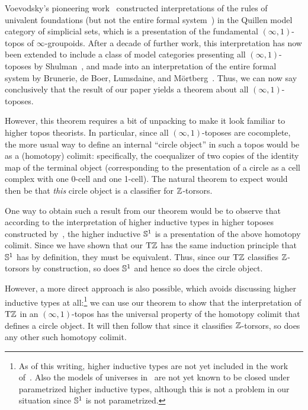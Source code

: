 \documentclass[a4paper,12pt]{amsart}
\begin{document}
Voevodsky's pioneering work~\cite{1211.2851} constructed interpretations of the rules of univalent foundations (but not the entire formal system~\cite{voevodsky:not-interp}) in the Quillen model category of simplicial sets, which is a presentation of the fundamental $(\infty,1)$-topos of $\infty$-groupoids.
After a decade of further work, this interpretation has now been extended to include a class of model categories presenting all $(\infty,1)$-toposes by Shulman~\cite{shulman:univinj}, and made into an interpretation of the entire formal system by Brunerie, de Boer, Lumsdaine, and M\"{o}rtberg~\cite{initiality}.
Thus, we can now say conclusively that the result of our paper yields a theorem about all $(\infty,1)$-toposes.

However, this theorem requires a bit of unpacking to make it look familiar to higher topos theorists.
In particular, since all $(\infty,1)$-toposes are cocomplete, the more usual way to define an internal ``circle object'' in such a topos would be as a (homotopy) colimit: specifically, the coequalizer of two copies of the identity map of the terminal object (corresponding to the presentation of a circle as a cell complex with one 0-cell and one 1-cell).
The natural theorem to expect would then be that \emph{this} circle object is a classifier for $\mathbb{Z}$-torsors.

One way to obtain such a result from our theorem would be to observe that according to the interpretation of higher inductive types in higher toposes constructed by~\cite{1705.07088}, the higher inductive ${\mathbb{S}^1}$ is a presentation of the above homotopy colimit.
Since we have shown that our ${\mathrm{T}\mathbb{Z}}$ has the same induction principle that ${\mathbb{S}^1}$ has by definition, they must be equivalent.
Thus, since our ${\mathrm{T}\mathbb{Z}}$ classifies $\mathbb{Z}$-torsors by construction, so does ${\mathbb{S}^1}$ and hence so does the circle object.

However, a more direct approach is also possible, which avoids discussing higher inductive types at all:\footnote{As of this writing, higher inductive types are not yet included in the work of~\cite{initiality}.  Also the models of universes in~\cite{shulman:univinj} are not yet known to be closed under parametrized higher inductive types, although this is not a problem in our situation since ${\mathbb{S}^1}$ is not parametrized.} we can use our theorem to show that the interpretation of ${\mathrm{T}\mathbb{Z}}$ in an $(\infty,1)$-topos has the universal property of the homotopy colimit that defines a circle object.
It will then follow that since it classifies $\mathbb{Z}$-torsors, so does any other such homotopy colimit.
\end{document}
